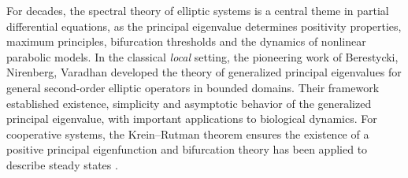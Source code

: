 \documentclass[a4paper,11pt]{amsart}
\theoremstyle{definition}
\numberwithin{equation}{section}
\theoremstyle{definition}
\begin{document}
\medskip


For decades, the spectral theory of elliptic systems is a central theme in partial differential equations, as the principal eigenvalue determines positivity properties, maximum principles, bifurcation thresholds and the dynamics of nonlinear parabolic models. In the classical \textit{local} setting, the pioneering work of Berestycki, Nirenberg, Varadhan \cite{berestycki_nirenberg_varadhan_1994} developed the theory of generalized principal eigenvalues for general second-order elliptic operators in bounded domains. Their framework established existence, simplicity and asymptotic behavior of the generalized principal eigenvalue, with important applications to biological dynamics. For cooperative systems, the Krein–Rutman theorem ensures the existence of a positive principal eigenfunction and bifurcation theory has been applied to describe steady states \cite{thieme_spectral_2009,wang_basic_2012}. 
\end{document}
